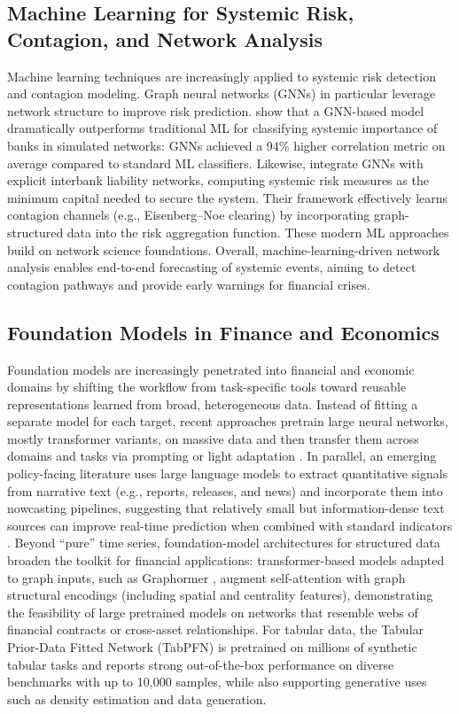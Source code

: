 \documentclass[preprint,12pt]{elsarticle}
\begin{document}
\subsection{Machine Learning for Systemic Risk, Contagion, and Network Analysis}
Machine learning techniques are increasingly applied to systemic risk detection and contagion modeling.  Graph neural networks (GNNs) in particular leverage network structure to improve risk prediction.  \cite{Balmaseda2023} show that a GNN-based model dramatically outperforms traditional ML for classifying systemic importance of banks in simulated networks: GNNs achieved a 94\% higher correlation metric on average compared to standard ML classifiers.  Likewise, \cite{Gonon2024} integrate GNNs with explicit interbank liability networks, computing systemic risk measures as the minimum capital needed to secure the system.  Their framework effectively learns contagion channels (e.g., Eisenberg--Noe clearing) by incorporating graph-structured data into the risk aggregation function.  These modern ML approaches build on network science foundations.  Overall, machine-learning-driven network analysis enables end-to-end forecasting of systemic events, aiming to detect contagion pathways and provide early warnings for financial crises.

\subsection{Foundation Models in Finance and Economics}

Foundation models are increasingly penetrated into financial and economic domains by shifting the workflow from task-specific tools toward reusable representations learned from broad, heterogeneous data. Instead of fitting a separate model for each target, recent approaches pretrain large neural networks, mostly transformer variants, on massive data and then transfer them across domains and tasks via prompting or light adaptation \citep{AnsariEtAl2024Chronos,RasulEtAl2023LagLlama,DasEtAl2024TimesFM}. In parallel, an emerging policy-facing literature uses large language models to extract quantitative signals from narrative text (e.g., reports, releases, and news) and incorporate them into nowcasting pipelines, suggesting that relatively small but information-dense text sources can improve real-time prediction when combined with standard indicators \citep{deBondtSun2025ChatGPTNowcast,KwonEtAl2024BISLLMprimer,CarrieroEtAl2024MacroLLM}. Beyond ``pure'' time series, foundation-model architectures for structured data broaden the toolkit for financial applications: transformer-based models adapted to graph inputs, such as Graphormer \citep{Ying2021Graphormer}, augment self-attention with graph structural encodings (including spatial and centrality features), demonstrating the feasibility of large pretrained models on networks that resemble webs of financial contracts or cross-asset relationships. For tabular data, the Tabular Prior-Data Fitted Network (TabPFN) \citep{HollmannEtAl2025TabPFN} is pretrained on millions of synthetic tabular tasks and reports strong out-of-the-box performance on diverse benchmarks with up to 10,000 samples, while also supporting generative uses such as density estimation and data generation. 
\end{document}

